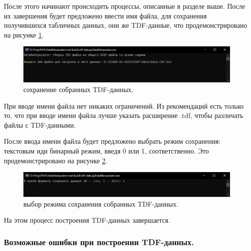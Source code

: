 {  \par После этого начинают происходить процессы, описанные в разделе выше. После их завершения будет предложено ввести имя файла, для сохранения получившихся табличных данных, они же TDF-данные, что продемонстрировано на рисунке \ref{fig:CreateTDFSR}.

  \begin{figure}[H]
    \centering
    \includegraphics[width=\textwidth]{images/forDataManipulator/CreateTDFSafeResult.png}
    \caption{сохранение собранных TDF-данных.}
    \label{fig:CreateTDFSR}
  \end{figure}

  \par При вводе имени файла нет никаких ограничений. Из рекомендаций есть только то, что при вводе имени файла лучше указать расширение .tdf, чтобы различать файлы с TDF-данными.
  
  \par После ввода имени файла будет предложено выбрать режим сохранения: текстовым иди бинарный режим, введя 0 или 1, соответственно. Это продемонстрировано на рисунке \ref{fig:CreateTDFTS}.

  \begin{figure}[H]
    \centering
    \includegraphics[width=\textwidth]{images/forDataManipulator/CreateTDFTypeSafe.png}
    \caption{выбор режима сохранения собранных TDF-данных.}
    \label{fig:CreateTDFTS}
  \end{figure}

  \par На этом процесс построения TDF-данных завершается.

  \par 

}

\subsubsection{ \standartTitleFont
  Возможные ошибки при построении TDF-данных.
} \label{subsubsec:CreateTDFErr}

